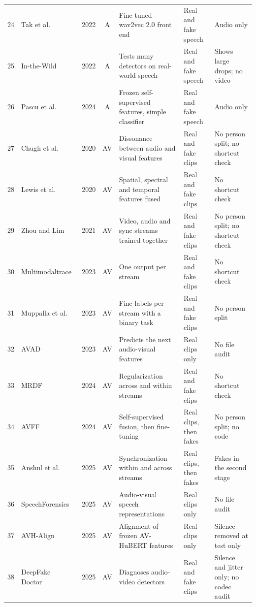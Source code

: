 {\begin{longtable}{@{}r >{\raggedright\arraybackslash}p{2.5cm} c c >{\raggedright\arraybackslash}p{3.9cm} >{\raggedright\arraybackslash}p{2.5cm} >{\raggedright\arraybackslash}p{3.5cm}@{}}
        24 & Tak et al.~\cite{tak2022} & 2022 & A & Fine-tuned wav2vec 2.0 front end & Real and fake speech & Audio only \\
        25 & In-the-Wild~\cite{mueller2022} & 2022 & A & Tests many detectors on real-world speech & Real and fake speech & Shows large drops; no video \\
        26 & Pascu et al.~\cite{pascu2024} & 2024 & A & Frozen self-supervised features, simple classifier & Real and fake speech & Audio only \\
        27 & Chugh et al.~\cite{notmade} & 2020 & AV & Dissonance between audio and visual features & Real and fake clips & No person split; no shortcut check \\
        28 & Lewis et al.~\cite{lewis2020} & 2020 & AV & Spatial, spectral and temporal features fused & Real and fake clips & No shortcut check \\
        29 & Zhou and Lim~\cite{zhou2021} & 2021 & AV & Video, audio and sync streams trained together & Real and fake clips & No person split; no shortcut check \\
        30 & Multimodaltrace~\cite{multimodaltrace} & 2023 & AV & One output per stream & Real and fake clips & No shortcut check \\
        31 & Muppalla et al.~\cite{muppalla2023} & 2023 & AV & Fine labels per stream with a binary task & Real and fake clips & No person split \\
        32 & AVAD~\cite{avad} & 2023 & AV & Predicts the next audio-visual features & Real clips only & No file audit \\
        33 & MRDF~\cite{mrdf} & 2024 & AV & Regularization across and within streams & Real and fake clips & No shortcut check \\
        34 & AVFF~\cite{avff} & 2024 & AV & Self-supervised fusion, then fine-tuning & Real clips, then fakes & No person split; no code \\
        35 & Anshul et al.~\cite{anshul2025} & 2025 & AV & Synchronization within and across streams & Real clips, then fakes & Fakes in the second stage \\
        36 & SpeechForensics~\cite{speechforensics} & 2025 & AV & Audio-visual speech representations & Real clips only & No file audit \\
        37 & AVH-Align~\cite{smeu2025} & 2025 & AV & Alignment of frozen AV-HuBERT features & Real clips only & Silence removed at test only \\
        38 & DeepFake Doctor~\cite{deepfakedoctor} & 2025 & AV & Diagnoses audio-video detectors & Real and fake clips & Silence and jitter only; no codec audit \\

\end{longtable}}
